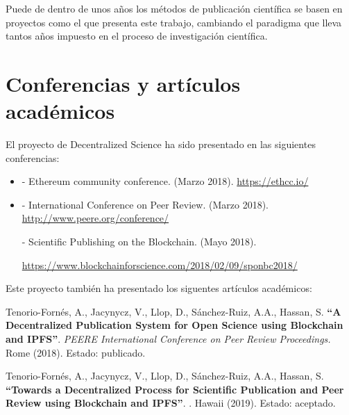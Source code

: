 Puede de dentro de unos años los métodos de publicación científica se basen en
proyectos como el que presenta este trabajo, cambiando el paradigma que lleva
tantos años impuesto en el proceso de investigación científica.


\section{Conferencias y artículos académicos}
\label{sec:conferences-papers}

El proyecto de Decentralized Science ha sido presentado en las siguientes conferencias:

\begin{itemize}
\item {} - Ethereum community conference.  (Marzo
  2018). \url{https://ethcc.io/}

\item {} - International Conference on Peer Review. 
  (Marzo 2018). \url{http://www.peere.org/conference/}

   - Scientific Publishing on the Blockchain.  (Mayo 2018).
  
  
  \url{https://www.blockchainforscience.com/2018/02/09/sponbc2018/}
\end{itemize}

Este proyecto también ha presentado los siguentes artículos académicos:

\begin{minipage}{\linewidth}
  Tenorio-Fornés, A., Jacynycz, V., Llop, D., Sánchez-Ruiz, A.A., Hassan, S.
  \textbf{``A Decentralized Publication System for Open Science using Blockchain
    and IPFS''}. \emph{PEERE International Conference on Peer Review
    Proceedings.} Rome (2018). Estado: publicado.
\end{minipage}

\vspace{5mm}

\begin{minipage}{\linewidth}
  Tenorio-Fornés, A., Jacynycz, V., Llop, D., Sánchez-Ruiz, A.A., Hassan, S.
  \textbf{``Towards a Decentralized Process for Scientific Publication and Peer
    Review using Blockchain and IPFS''}. . Hawaii (2019). Estado: aceptado.
\end{minipage}
